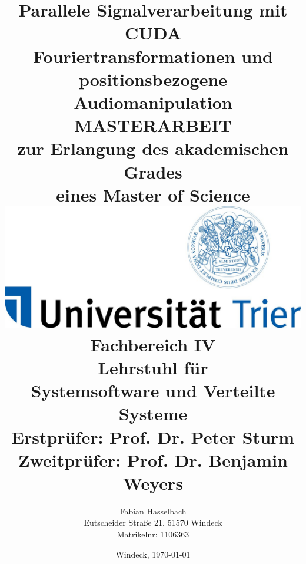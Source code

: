 \begin{titlepage}
	\title{ \normalsize \textsc{}
		\LARGE \textbf{Parallele Signalverarbeitung mit CUDA}  \\ [0.5cm]
		\normalsize \textbf{Fouriertransformationen und positionsbezogene Audiomanipulation} \\ [0.6cm]
		
		\Large \textbf{MASTERARBEIT}	\\ [0.5cm]
		\Large zur Erlangung des akademischen Grades \\ eines Master of Science \\ [0.8cm]
		
		\includegraphics[scale=0.3]{logo_mit_siegel.jpg}
		\\[1cm]
		
		\Large Fachbereich IV \\ [0.3cm]
		\Large Lehrstuhl für\\ [0.4cm]
		\Large \textbf{Systemsoftware und Verteilte Systeme} \\ [0.5cm]
		\normalsize Erstprüfer: Prof. Dr. Peter Sturm  \\	
		\normalsize Zweitprüfer: Prof. Dr. Benjamin Weyers \\
	}
	\author{
		Fabian Hasselbach \\ 
		Eutscheider Straße 21, 51570 Windeck \\
		Matrikelnr: 1106363
	}
	
	\date{
		\normalsize Windeck, \today 
	}
	
	\maketitle
	
	\newpage
	\tableofcontents	
	\newpage
	\cleardoublepage%
\end{titlepage}
